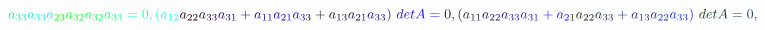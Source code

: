 \documentclass[12pt]{article}
\begin{document}
\begin{displaymath}
\mathcolor[RGB]{15,240,165}{a} _ { \mathcolor[RGB]{15,240,180}{3} \mathcolor[RGB]{15,240,195}{3} } \mathcolor[RGB]{15,240,210}{a} _ { \mathcolor[RGB]{15,240,225}{3} \mathcolor[RGB]{15,240,240}{3} } \mathcolor[RGB]{15,240,255}{a} _ { \mathcolor[RGB]{15,255,0}{2} \mathcolor[RGB]{15,255,15}{3} } \mathcolor[RGB]{15,255,30}{a} _ { \mathcolor[RGB]{15,255,45}{3} \mathcolor[RGB]{15,255,60}{2} } \mathcolor[RGB]{15,255,75}{a} _ { \mathcolor[RGB]{15,255,90}{3} \mathcolor[RGB]{15,255,105}{2} } \mathcolor[RGB]{15,255,120}{a} _ { \mathcolor[RGB]{15,255,135}{3} \mathcolor[RGB]{15,255,150}{3} } \mathcolor[RGB]{15,255,165}{=} \mathcolor[RGB]{15,255,180}{0} \mathcolor[RGB]{15,255,195}{,} \mathcolor[RGB]{15,255,210}{(} \mathcolor[RGB]{15,255,225}{a} _ { \mathcolor[RGB]{15,255,240}{1} \mathcolor[RGB]{15,255,255}{2} } \mathcolor[RGB]{30,0,0}{a} _ { \mathcolor[RGB]{30,0,15}{2} \mathcolor[RGB]{30,0,30}{2} } \mathcolor[RGB]{30,0,45}{a} _ { \mathcolor[RGB]{30,0,60}{3} \mathcolor[RGB]{30,0,75}{3} } \mathcolor[RGB]{30,0,90}{a} _ { \mathcolor[RGB]{30,0,105}{3} \mathcolor[RGB]{30,0,120}{1} } \mathcolor[RGB]{30,0,135}{+} \mathcolor[RGB]{30,0,150}{a} _ { \mathcolor[RGB]{30,0,165}{1} \mathcolor[RGB]{30,0,180}{1} } \mathcolor[RGB]{30,0,195}{a} _ { \mathcolor[RGB]{30,0,210}{2} \mathcolor[RGB]{30,0,225}{1} } \mathcolor[RGB]{30,0,240}{a} _ { \mathcolor[RGB]{30,0,255}{3} \mathcolor[RGB]{30,15,0}{3} } \mathcolor[RGB]{30,15,15}{+} \mathcolor[RGB]{30,15,30}{a} _ { \mathcolor[RGB]{30,15,45}{1} \mathcolor[RGB]{30,15,60}{3} } \mathcolor[RGB]{30,15,75}{a} _ { \mathcolor[RGB]{30,15,90}{2} \mathcolor[RGB]{30,15,105}{1} } \mathcolor[RGB]{30,15,120}{a} _ { \mathcolor[RGB]{30,15,135}{3} \mathcolor[RGB]{30,15,150}{3} } \mathcolor[RGB]{30,15,165}{)} \mathcolor[RGB]{30,15,180}{\operatorname*} { \mathcolor[RGB]{30,15,195}{d} \mathcolor[RGB]{30,15,210}{e} \mathcolor[RGB]{30,15,225}{t} } \mathcolor[RGB]{30,15,240}{A} \mathcolor[RGB]{30,15,255}{=} \mathcolor[RGB]{30,30,0}{0} \mathcolor[RGB]{30,30,15}{,} \mathcolor[RGB]{30,30,30}{(} \mathcolor[RGB]{30,30,45}{a} _ { \mathcolor[RGB]{30,30,60}{1} \mathcolor[RGB]{30,30,75}{1} } \mathcolor[RGB]{30,30,90}{a} _ { \mathcolor[RGB]{30,30,105}{2} \mathcolor[RGB]{30,30,120}{2} } \mathcolor[RGB]{30,30,135}{a} _ { \mathcolor[RGB]{30,30,150}{3} \mathcolor[RGB]{30,30,165}{3} } \mathcolor[RGB]{30,30,180}{a} _ { \mathcolor[RGB]{30,30,195}{3} \mathcolor[RGB]{30,30,210}{1} } \mathcolor[RGB]{30,30,225}{+} \mathcolor[RGB]{30,30,240}{a} _ { \mathcolor[RGB]{30,30,255}{2} \mathcolor[RGB]{30,45,0}{1} } \mathcolor[RGB]{30,45,15}{a} _ { \mathcolor[RGB]{30,45,30}{2} \mathcolor[RGB]{30,45,45}{2} } \mathcolor[RGB]{30,45,60}{a} _ { \mathcolor[RGB]{30,45,75}{3} \mathcolor[RGB]{30,45,90}{3} } \mathcolor[RGB]{30,45,105}{+} \mathcolor[RGB]{30,45,120}{a} _ { \mathcolor[RGB]{30,45,135}{1} \mathcolor[RGB]{30,45,150}{3} } \mathcolor[RGB]{30,45,165}{a} _ { \mathcolor[RGB]{30,45,180}{2} \mathcolor[RGB]{30,45,195}{2} } \mathcolor[RGB]{30,45,210}{a} _ { \mathcolor[RGB]{30,45,225}{3} \mathcolor[RGB]{30,45,240}{3} } \mathcolor[RGB]{30,45,255}{)} \mathcolor[RGB]{30,60,0}{\operatorname*} { \mathcolor[RGB]{30,60,15}{d} \mathcolor[RGB]{30,60,30}{e} \mathcolor[RGB]{30,60,45}{t} } \mathcolor[RGB]{30,60,60}{A} \mathcolor[RGB]{30,60,75}{=} \mathcolor[RGB]{30,60,90}{0} \mathcolor[RGB]{30,60,105}{,} 
\end{displaymath}
\end{document}
